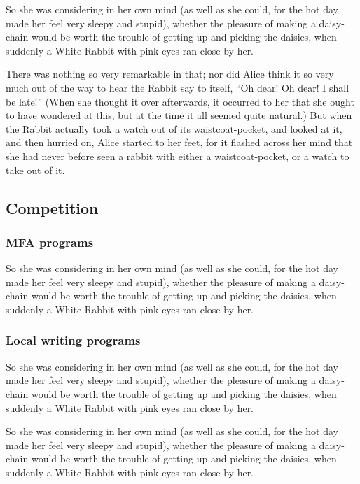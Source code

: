 \documentclass[12pt]{article}
\begin{document}
So she was considering in her own mind (as well as she could, for the hot day made her feel very sleepy and stupid), whether the pleasure of making a daisy-chain would be worth the trouble of getting up and picking the daisies, when suddenly a White Rabbit with pink eyes ran close by her.

There was nothing so very remarkable in that; nor did Alice think it so very much out of the way to hear the Rabbit say to itself, ``Oh dear! Oh dear! I shall be late!'' (When she thought it over afterwards, it occurred to her that she ought to have wondered at this, but at the time it all seemed quite natural.) But when the Rabbit actually took a watch out of its waistcoat-pocket, and looked at it, and then hurried on, Alice started to her feet, for it flashed across her mind that she had never before seen a rabbit with either a waistcoat-pocket, or a watch to take out of it. 

\subsection{Competition}
\label{sec-3-2}

\subsubsection{MFA programs}
\label{sec-3-2-1}
So she was considering in her own mind (as well as she could, for the hot day made her feel very sleepy and stupid), whether the pleasure of making a daisy-chain would be worth the trouble of getting up and picking the daisies, when suddenly a White Rabbit with pink eyes ran close by her. 

\subsubsection{Local writing programs}
\label{sec-3-2-2}
So she was considering in her own mind (as well as she could, for the hot day made her feel very sleepy and stupid), whether the pleasure of making a daisy-chain would be worth the trouble of getting up and picking the daisies, when suddenly a White Rabbit with pink eyes ran close by her. 

So she was considering in her own mind (as well as she could, for the hot day made her feel very sleepy and stupid), whether the pleasure of making a daisy-chain would be worth the trouble of getting up and picking the daisies, when suddenly a White Rabbit with pink eyes ran close by her. 
\end{document}
